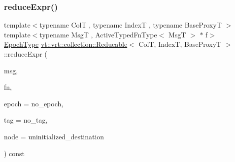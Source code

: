 \subsubsection{\texorpdfstring{reduce\+Expr()}{reduceExpr()}\hspace{0.1cm}{\footnotesize\ttfamily [1/2]}}
{\footnotesize\ttfamily template$<$typename ColT , typename IndexT , typename Base\+ProxyT $>$ \\
template$<$typename MsgT , Active\+Typed\+Fn\+Type$<$ Msg\+T $>$ $\ast$ f$>$ \\
\hyperlink{namespacevt_a985a5adf291c34a3ca263b3378388236}{Epoch\+Type} \hyperlink{structvt_1_1vrt_1_1collection_1_1_reducable}{vt\+::vrt\+::collection\+::\+Reducable}$<$ ColT, IndexT, Base\+ProxyT $>$\+::reduce\+Expr (\begin{DoxyParamCaption}\item[{MsgT $\ast$const}]{msg,  }\item[{\hyperlink{structvt_1_1vrt_1_1collection_1_1_reducable_a9f5a6c385efafe1fa52937f4809a9486}{Reduce\+Idx\+Func\+Type}}]{fn,  }\item[{\hyperlink{namespacevt_a985a5adf291c34a3ca263b3378388236}{Epoch\+Type} const \&}]{epoch = {\ttfamily no\+\_\+epoch},  }\item[{\hyperlink{namespacevt_a84ab281dae04a52a4b243d6bf62d0e52}{Tag\+Type} const \&}]{tag = {\ttfamily no\+\_\+tag},  }\item[{\hyperlink{namespacevt_a866da9d0efc19c0a1ce79e9e492f47e2}{Node\+Type} const \&}]{node = {\ttfamily uninitialized\+\_\+destination} }\end{DoxyParamCaption}) const}

\mbox{\label{structvt_1_1vrt_1_1collection_1_1_reducable_a6f8d457832242aa26bbce67e9d6318a0}} 
